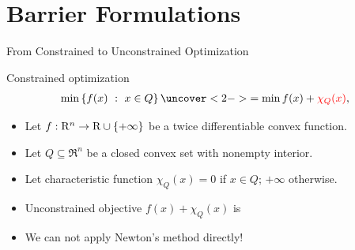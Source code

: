 \documentclass[9pt]{beamer}
\begin{document}
\section{Barrier Formulations}

\begin{frame}{From Constrained to Unconstrained Optimization}

  Constrained optimization
  \[
    \begin{array}{rl}
      \min \set{f(  x)}{  x\in Q} \uncover<2->{= \min f(  x) + \red{\chi_Q(  x)},}
    \end{array}
  \]

  \begin{itemize}
  \item  Let $f : \mathrm{R}^n\to\mathrm{R}\cup\{+\infty\}$ be a twice differentiable convex function.\\
  \item  Let $Q \subseteq \Re^n$ be a closed convex set with {nonempty interior}.
  \item <2-> Let characteristic function $\chi_Q(  x) = 0$ if $  x\in Q$; $+\infty$ otherwise.

  \item<3-> Unconstrained objective $f(  x) + \chi_Q(  x)$ is 
  \item<3-> We can not apply Newton's method directly!
  \end{itemize}

  \vfill

\end{frame}
\end{document}
